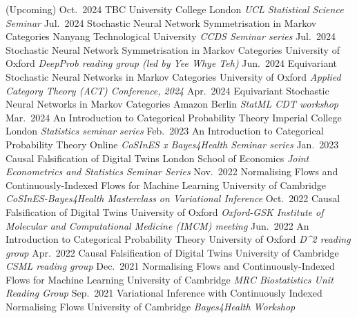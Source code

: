 \documentclass[9pt]{developercv} %
\begin{document}
\begin{entrylist}
    \entry
        {(Upcoming) Oct.\ 2024}
        {TBC}
        {University College London}
        {\textit{UCL Statistical Science Seminar}}
    \entry
        {Jul.\ 2024}
        {Stochastic Neural Network Symmetrisation in Markov Categories}
        {Nanyang Technological University}
        {\textit{CCDS Seminar series}}
    \entry
        {Jul.\ 2024}
        {Stochastic Neural Network Symmetrisation in Markov Categories}
        {University of Oxford}
        {\textit{DeepProb reading group (led by Yee Whye Teh)}}
    \entry
        {Jun.\ 2024}
        {Equivariant Stochastic Neural Networks in Markov Categories}
        {University of Oxford}
        {\textit{Applied Category Theory (ACT) Conference, 2024}}
    \entry
        {Apr.\ 2024}
        {Equivariant Stochastic Neural Networks in Markov Categories}
        {Amazon Berlin}
        {\textit{StatML CDT workshop}}
    \entry
        {Mar.\ 2024}
        {An Introduction to Categorical Probability Theory}
        {Imperial College London}
        {\textit{Statistics seminar series}}
    \entry
        {Feb.\ 2023}
        {An Introduction to Categorical Probability Theory}
        {Online}
        {\textit{CoSInES x Bayes4Health Seminar series}}
    \entry
        {Jan.\ 2023}
        {Causal Falsification of Digital Twins}
        {London School of Economics}
        {\textit{Joint Econometrics and Statistics Seminar Series}}
    \entry
        {Nov.\ 2022}
        {Normalising Flows and Continuously-Indexed Flows for Machine Learning}
        {University of Cambridge}
        {\textit{CoSInES-Bayes4Health Masterclass on Variational Inference}}
    \entry
        {Oct.\ 2022}
        {Causal Falsification of Digital Twins}
        {University of Oxford}
        {\textit{Oxford-GSK Institute of Molecular and Computational Medicine (IMCM) meeting}}
    \entry
        {Jun.\ 2022}
        {An Introduction to Categorical Probability Theory}
        {University of Oxford}
        {\textit{D\textasciicircum 2 reading group}}
    \entry
        {Apr.\ 2022}
        {Causal Falsification of Digital Twins}
        {University of Cambridge}
        {\textit{CSML reading group}}
    \entry
        {Dec.\ 2021}
        {Normalising Flows and Continuously-Indexed Flows for Machine Learning}
        {University of Cambridge}
        {\textit{MRC Biostatistics Unit Reading Group}}
    \entry
        {Sep.\ 2021}%
        {Variational Inference with Continuously Indexed Normalising Flows}
        {University of Cambridge}
        {\textit{Bayes4Health Workshop}}
\end{entrylist}
\end{document}
